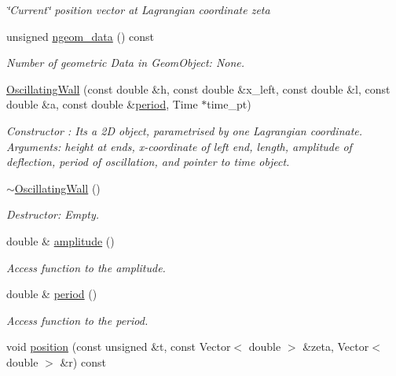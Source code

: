 \begin{DoxyCompactItemize}
\begin{DoxyCompactList}\small\item\em \char`\"{}\+Current\char`\"{} position vector at Lagrangian coordinate zeta \end{DoxyCompactList}\item 
unsigned \hyperlink{classOscillatingWall_ae3fa3ef50ef7e082b255ba8125373581}{ngeom\+\_\+data} () const
\begin{DoxyCompactList}\small\item\em Number of geometric Data in Geom\+Object\+: None. \end{DoxyCompactList}\item 
\hyperlink{classOscillatingWall_a5ededc3d27eef5c4ef7e82ac5cdf6ff9}{Oscillating\+Wall} (const double \&h, const double \&x\+\_\+left, const double \&l, const double \&a, const double \&\hyperlink{classOscillatingWall_ac3e0098c026e23dd8be8ea29f6a9c101}{period}, Time $\ast$time\+\_\+pt)
\begin{DoxyCompactList}\small\item\em Constructor \+: It\textquotesingle{}s a 2D object, parametrised by one Lagrangian coordinate. Arguments\+: height at ends, x-\/coordinate of left end, length, amplitude of deflection, period of oscillation, and pointer to time object. \end{DoxyCompactList}\item 
\hyperlink{classOscillatingWall_adc35b40bdd733a244d6399d91fa20ade}{$\sim$\+Oscillating\+Wall} ()
\begin{DoxyCompactList}\small\item\em Destructor\+: Empty. \end{DoxyCompactList}\item 
double \& \hyperlink{classOscillatingWall_ae923c6a7abefe33efaf47a4b69d1b621}{amplitude} ()
\begin{DoxyCompactList}\small\item\em Access function to the amplitude. \end{DoxyCompactList}\item 
double \& \hyperlink{classOscillatingWall_ac3e0098c026e23dd8be8ea29f6a9c101}{period} ()
\begin{DoxyCompactList}\small\item\em Access function to the period. \end{DoxyCompactList}\item 
void \hyperlink{classOscillatingWall_abb4ae7e556479d2980a56963bd8d4558}{position} (const unsigned \&t, const Vector$<$ double $>$ \&zeta, Vector$<$ double $>$ \&r) const

\end{DoxyCompactItemize}
